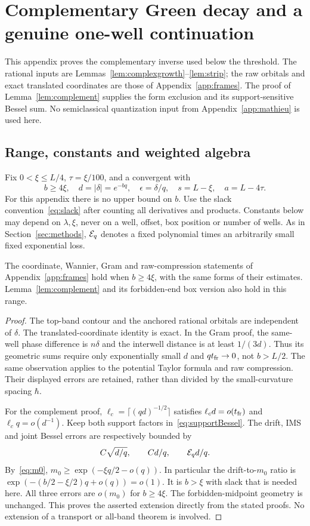 \section{Complementary Green decay and a genuine one-well continuation}\label{app:below-resolvent}
This appendix proves the complementary inverse used below the threshold. The rational inputs are Lemmas~\ref{lem:complexgrowth}--\ref{lem:strip}; the raw orbitals and exact translated coordinates are those of Appendix~\ref{app:frames}. The proof of Lemma~\ref{lem:complement} supplies the form exclusion and its support-sensitive Bessel sum. No semiclassical quantization input from Appendix~\ref{app:mathieu} is used here.

\subsection{Range, constants and weighted algebra}
Fix $0<\xi\le L/4$, $\tau=\xi/100$, and a convergent with
\[
 b\ge4\xi,\quad d=|\delta|=e^{-bq},\quad \epsilon=\delta/q,\quad
 s=L-\xi,\quad a=L-4\tau.
\]
For this appendix there is no upper bound on $b$. Use the slack convention~\eqref{eq:slack} after counting all derivatives and products. Constants below may depend on $\lambda,\xi$, never on a well, offset, box position or number of wells. As in Section~\ref{sec:methods}, $\mathcal E_q$ denotes a fixed polynomial times an arbitrarily small fixed exponential loss.

\begin{lemma}\label{lem:belowrange}
The coordinate, Wannier, Gram and raw-compression statements of Appendix~\ref{app:frames} hold when $b\ge4\xi$, with the same forms of their estimates. Lemma~\ref{lem:complement} and its forbidden-end box version also hold in this range.
\end{lemma}
\begin{proof}
The top-band contour and the anchored rational orbitals are independent of $\delta$. The translated-coordinate identity is exact. In the Gram proof, the same-well phase difference is $n\delta$ and the interwell distance is at least $1/(3d)$. Thus its geometric sums require only exponentially small $d$ and $qt_{\rm fr}\to0$, not $b>L/2$. The same observation applies to the potential Taylor formula and raw compression. Their displayed errors are retained, rather than divided by the small-curvature spacing $\hbar$.

For the complement proof, $\ell_c=\lceil(qd)^{-1/2}\rceil$ satisfies
$\ell_c d=o(t_{\rm fr})$ and $\ell_c q=o(d^{-1})$. Keep both support factors in~\eqref{eq:supportBessel}. The drift, IMS and joint Bessel errors are respectively bounded by
\[
 C\sqrt{d/q},\qquad Cd/q,\qquad \mathcal E_q d/q.
\]
By~\eqref{eq:m0}, $m_0\ge\exp(-\xi q/2-o(q))$. In particular the drift-to-$m_0$ ratio is
$\exp(-(b/2-\xi/2)q+o(q))=o(1)$. It is $b>\xi$ with slack that is needed here. All three errors are $o(m_0)$ for $b\ge4\xi$. The forbidden-midpoint geometry is unchanged. This proves the asserted extension directly from the stated proofs. No extension of a transport or all-band theorem is involved.
\end{proof}

